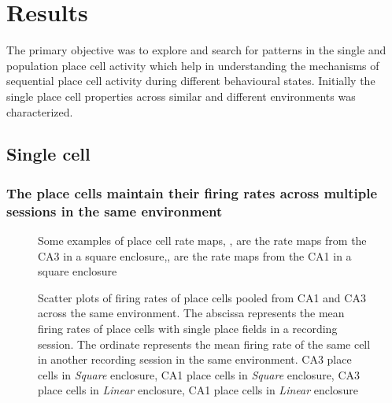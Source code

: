 \chapter{Results}
\label{results}

The primary objective was to explore and search for patterns in the single and population place cell activity which help in understanding the mechanisms of sequential place cell activity during different behavioural states. Initially the single place cell properties across similar and different environments was characterized.  

\section{Single cell}
\subsection*{The place cells maintain their firing rates across multiple sessions in the same environment}
\begin{figure}[htb!]
\label{fig:ratemaps}
\caption[Rate maps]{Some examples of place cell rate maps, ,  are the rate maps from the CA3 in a square enclosure,,  are the rate maps from the CA1 in a square enclosure}
\end{figure}

\begin{figure}[htb!]
{}

\label{fig:rateremapping}
\caption[Rate Remapping]{Scatter plots of firing rates of place cells pooled from CA1 and CA3  across the same environment. The abscissa represents the mean firing rates of place cells with single place fields in a recording session. The ordinate represents the mean firing rate of the same cell in another recording session in the same environment.  CA3 place cells in \emph{Square} enclosure,  CA1 place cells in \emph{Square} enclosure,  CA3 place cells in \emph{Linear} enclosure,  CA1 place cells in \emph{Linear} enclosure}
\end{figure}

